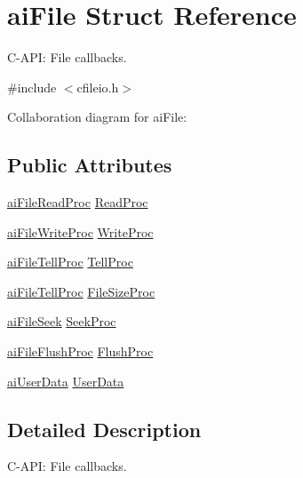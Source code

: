 \hypertarget{structai_file}{\section{ai\-File Struct Reference}
\label{structai_file}
}


C-\/\-A\-P\-I\-: File callbacks.  




{\ttfamily \#include $<$cfileio.\-h$>$}



Collaboration diagram for ai\-File\-:
\subsection*{Public Attributes}
\begin{DoxyCompactItemize}
\item 
\hyperlink{cfileio_8h_ac75a77859a761dafe8c0a149316c9025}{ai\-File\-Read\-Proc} \hyperlink{structai_file_a52287e81ca67b9d43cc1ce6142f781fa}{Read\-Proc}
\item 
\hyperlink{cfileio_8h_ab25827ce1f6f1fcb37232f1e945947da}{ai\-File\-Write\-Proc} \hyperlink{structai_file_ab9fca3a62e34a33592c13a6f31db7d1d}{Write\-Proc}
\item 
\hyperlink{cfileio_8h_a91bcb34135f0fc52b84d0a71b1ac9416}{ai\-File\-Tell\-Proc} \hyperlink{structai_file_aaf2d88a3b2fcbdacf51119658283d27e}{Tell\-Proc}
\item 
\hyperlink{cfileio_8h_a91bcb34135f0fc52b84d0a71b1ac9416}{ai\-File\-Tell\-Proc} \hyperlink{structai_file_aff2fff8c0458e7ec71f7de217c3a3033}{File\-Size\-Proc}
\item 
\hyperlink{cfileio_8h_a21b9c66913c05cd79fad0eece086efb3}{ai\-File\-Seek} \hyperlink{structai_file_a7a07b499be4ad433669246479a4d4ad2}{Seek\-Proc}
\item 
\hyperlink{cfileio_8h_ab7018edd452f13ade57309865cb3bcdb}{ai\-File\-Flush\-Proc} \hyperlink{structai_file_a1102d28d1c0be68ffed20476669bdb0d}{Flush\-Proc}
\item 
\hyperlink{cfileio_8h_a176132d0cd51c96302089ff3f8a8ee1c}{ai\-User\-Data} \hyperlink{structai_file_aec528fa18f4755fe4f28d604fde28aad}{User\-Data}
\end{DoxyCompactItemize}


\subsection{Detailed Description}
C-\/\-A\-P\-I\-: File callbacks. 

